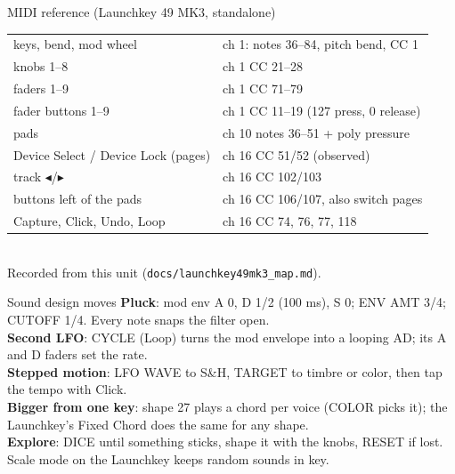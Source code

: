 \documentclass{article}
\begin{document}
\begin{minipage}[t]{112mm}
\begin{card}{MIDI reference (Launchkey 49 MK3, standalone)}
\fontsize{7.4}{9.0}\selectfont
\setlength{\tabcolsep}{3pt}
\begin{tabular}{@{}l l@{}}
keys, bend, mod wheel & ch 1: notes 36--84, pitch bend, CC 1 \\
knobs 1--8 & ch 1 CC 21--28 \\
faders 1--9 & ch 1 CC 71--79 \\
fader buttons 1--9 & ch 1 CC 11--19 (127 press, 0 release) \\
pads & ch 10 notes 36--51 + poly pressure \\
Device Select / Device Lock (pages) & ch 16 CC 51/52 (observed) \\
track \(\blacktriangleleft\)/\(\blacktriangleright\) & ch 16 CC 102/103 \\
buttons left of the pads & ch 16 CC 106/107, also switch pages \\
Capture, Click, Undo, Loop & ch 16 CC 74, 76, 77, 118 \\
\end{tabular}\\[0.4mm]
Recorded from this unit (\texttt{docs/launchkey49mk3\_map.md}).
\end{card}

\begin{card}{Sound design moves}
\fontsize{7.4}{9.0}\selectfont
\textbf{Pluck}: mod env A 0, D 1/2 (100 ms), S 0; ENV AMT 3/4; CUTOFF 1/4. Every note snaps the filter open.\\[0.3mm]
\textbf{Second LFO}: CYCLE (Loop) turns the mod envelope into a looping AD; its A and D faders set the rate.\\[0.3mm]
\textbf{Stepped motion}: LFO WAVE to S\&H, TARGET to timbre or color, then tap the tempo with Click.\\[0.3mm]
\textbf{Bigger from one key}: shape 27 plays a chord per voice (COLOR picks it); the Launchkey's
Fixed Chord does the same for any shape.\\[0.3mm]
\textbf{Explore}: DICE until something sticks, shape it with the knobs, RESET if lost.
Scale mode on the Launchkey keeps random sounds in key.
\end{card}
\end{minipage}
\end{document}
